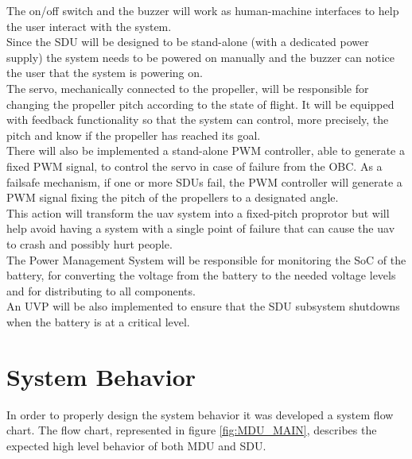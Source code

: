 The on/off switch and the buzzer will work as human-machine interfaces to help the user interact with the system.\\
Since the SDU will be designed to be stand-alone (with a dedicated power supply) the system needs to be powered on manually and the buzzer can notice the user that the system is powering on.\\

The servo, mechanically connected to the propeller, will be responsible for changing the propeller pitch according to the state of flight.
It will be equipped with feedback functionality so that the system can control, more precisely, the pitch and know if the propeller has reached its goal.\\

There will also be implemented a stand-alone \gls{PWM} controller, able to generate a fixed \gls{PWM} signal, to control the servo in case of failure from the \gls{OBC}.
As a failsafe mechanism, if one or more SDUs fail, the \gls{PWM} controller will generate a \gls{PWM} signal fixing the pitch of the propellers to a designated angle.\\
This action will transform the \gls{uav} system into a fixed-pitch proprotor but will help avoid having a system with a single point of failure that can cause the \gls{uav} to crash and possibly hurt people.\\

The Power Management System will be responsible for monitoring the \gls{SoC} of the battery, for converting the voltage from the battery to the needed voltage levels and for distributing to all components.\\
An \gls{UVP} will be also implemented to ensure that the SDU subsystem shutdowns when the battery is at a critical level.


\section{System Behavior}

In order to properly design the system behavior it was developed a system flow chart.
The flow chart, represented in figure \ref{fig:MDU_MAIN}, describes the expected high level behavior of both MDU and SDU.
 
